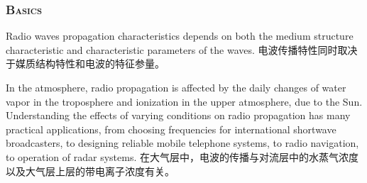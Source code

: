 \documentclass[aspectratio=169, 10pt, utf8, mathserif]{beamer}
\def\hilite<#1>{\temporal<#1>{\color{blue!80}}{\color{blue!85!white}}{\color{black}}}%
\numberwithin{equation}{section} %
\numberwithin{figure}{section} %
\begin{document}
\begin{frame}%
\frametitle{\textsc{Basics}}

\small

\hilite<1>Radio waves propagation characteristics depends on both
the medium structure characteristic and characteristic parameters of
the waves.
电波传播特性同时取决于媒质结构特性和电波的特征参量。\pause

\hilite<2>In the atmosphere, radio propagation is affected by the
daily changes of water vapor in the troposphere and ionization in
the upper atmosphere, due to the Sun. Understanding the effects of
varying conditions on radio propagation has many practical
applications, from choosing frequencies for international shortwave
broadcasters, to designing reliable mobile telephone systems, to
radio navigation, to operation of radar systems.
在大气层中，电波的传播与对流层中的水蒸气浓度以及大气层上层的带电离子浓度有关。

\end{frame}








\end{document}
